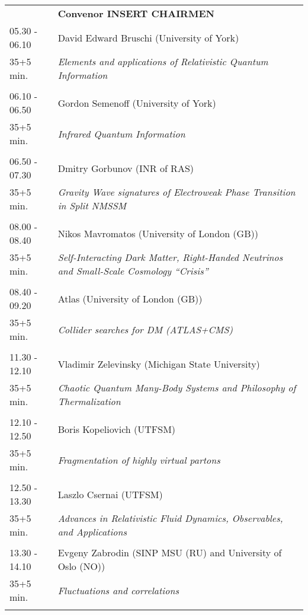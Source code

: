 \begin{longtable}{p{3cm}p{13cm}}
&\hfill {\bf Convenor INSERT CHAIRMEN }\\ 
05.30 - 06.10 & David Edward Bruschi (University of York)\\ 
35+5 min. & {\it Elements and applications of Relativistic Quantum Information}\\ 
 & \\ 
06.10 - 06.50 & Gordon Semenoff (University of York)\\ 
35+5 min. & {\it Infrared Quantum Information}\\ 
 & \\ 
06.50 - 07.30 & Dmitry Gorbunov (INR of RAS)\\ 
35+5 min. & {\it Gravity Wave signatures of Electroweak Phase Transition in Split NMSSM}\\ 
 & \\ 
08.00 - 08.40 & Nikos Mavromatos (University of London (GB))\\ 
35+5 min. & {\it Self-Interacting Dark Matter, Right-Handed Neutrinos and Small-Scale Cosmology ``Crisis''}\\ 
 & \\ 
08.40 - 09.20 & Atlas (University of London (GB))\\ 
35+5 min. & {\it Collider searches for DM (ATLAS+CMS)}\\ 
 & \\ 
11.30 - 12.10 & Vladimir Zelevinsky (Michigan State University)\\ 
35+5 min. & {\it Chaotic Quantum Many-Body Systems and Philosophy of Thermalization}\\ 
 & \\ 
12.10 - 12.50 & Boris Kopeliovich (UTFSM)\\ 
35+5 min. & {\it Fragmentation of highly virtual partons}\\ 
 & \\ 
12.50 - 13.30 & Laszlo Csernai (UTFSM)\\ 
35+5 min. & {\it Advances in Relativistic Fluid Dynamics, Observables, and Applications}\\ 
 & \\ 
13.30 - 14.10 & Evgeny Zabrodin (SINP MSU (RU) and University of Oslo (NO))\\ 
35+5 min. & {\it Fluctuations and correlations}\\ 
 & \\ 
\end{longtable}

